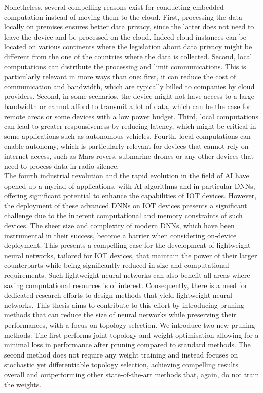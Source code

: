 Nonetheless, several compelling reasons exist for conducting embedded
computation instead of moving them to the cloud. First, processing the data
locally on premises ensures better data privacy, since the latter does not need
to leave the device and be processed on the cloud. Indeed cloud instances can be
located on various continents where the legislation about data privacy might be
different from the one of the countries where the data is collected. Second,
local computations can distribute the processing and limit communications. This
is particularly relevant in more ways than one: first, it can reduce the cost of
communication and bandwidth, which are typically billed to companies by cloud
providers. Second, in some scenarios, the device might not have access to a
large bandwidth or cannot afford to transmit a lot of data, which can be the
case for remote areas or some devices with a low power budget. Third, local
computations can lead to greater responsiveness by reducing latency, which might
be critical in some applications such as autonomous vehicles. Fourth, local
computations can enable autonomy, which is particularly relevant for devices
that cannot rely on internet access, such as Mars rovers, submarine drones or
any other devices that need to process data in radio silence.\\

The fourth industrial revolution and the rapid evolution in the field of \ac{AI}
have opened up a myriad of applications, with \ac{AI} algorithms and in
particular \acp{DNN}, offering significant potential to enhance the capabilities
of \ac{IOT} devices. However, the deployment of these advanced \acp{DNN} on
\ac{IOT} devices presents a significant challenge due to the inherent
computational and memory constraints of such devices. The sheer size and
complexity of modern \acp{DNN}, which have been instrumental in their success,
become a barrier when considering on-device deployment. This presents a
compelling case for the development of lightweight neural networks, tailored for
\ac{IOT} devices, that maintain the power of their larger counterparts while
being significantly reduced in size and computational requirements. Such
lightweight neural networks can also benefit all areas where saving
computational resources is of interest. Consequently, there is a need for
dedicated research efforts to design methods that yield lightweight neural
networks. This thesis aims to contribute to this effort by introducing pruning
methods that can reduce the size of neural networks while preserving their
performances, with a focus on topology selection. We introduce two new pruning
methods: The first performs joint topology and weight optimisation allowing for
a minimal loss in performance after pruning compared to standard methods. The
second method does not require any weight training and instead focuses on
stochastic yet differentiable topology selection, achieving compelling results
overall and outperforming other state-of-the-art methods that, again, do not
train the weights.

